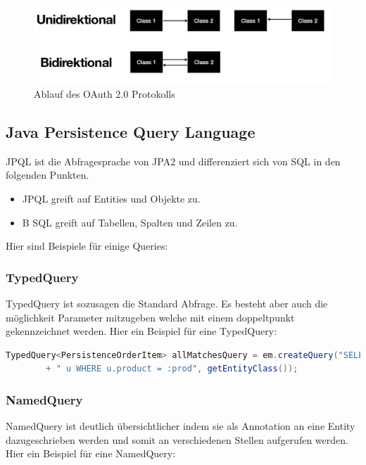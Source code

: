 \begin{figure}[htp]
    \centering
    \includegraphics[scale=0.4]{pics/biunddi.JPG}
    \caption{Ablauf des OAuth 2.0 Protokolls}
    \label{fig:impl:UnidirektionalBidirektional}
\end{figure}

\subsection{Java Persistence Query Language}

JPQL ist die Abfragesprache von JPA2 und differenziert sich von SQL in den folgenden Punkten.


\begin{itemize}
    \item JPQL greift auf Entities und Objekte zu.
    \item B SQL greift auf Tabellen, Spalten und Zeilen zu.
\end{itemize}

Hier sind Beispiele für einige Queries:

\subsubsection{TypedQuery}

TypedQuery ist sozusagen die Standard Abfrage. Es besteht aber auch die möglichkeit Parameter mitzugeben welche mit einem doppeltpunkt gekennzeichnet werden.
Hier ein Beispiel für eine TypedQuery:

\begin{lstlisting}[language=Java,caption=JPA Entity,label=lst:impl:foo]
    TypedQuery<PersistenceOrderItem> allMatchesQuery = em.createQuery("SELECT u FROM " + getEntityClass().getName()
        + " u WHERE u.product = :prod", getEntityClass());
\end{lstlisting}


\subsubsection{NamedQuery}

NamedQuery ist deutlich übersichtlicher indem sie als Annotation an eine Entity dazugeschrieben werden und somit an verschiedenen Stellen aufgerufen werden. 
Hier ein Beispiel für eine NamedQuery:

